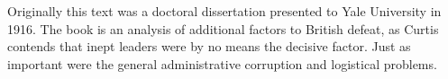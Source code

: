 Originally this text was a doctoral dissertation presented to Yale University in 1916. The book is an analysis of additional factors to British defeat, as Curtis contends that inept leaders were by no means the decisive factor. Just as important were the general administrative corruption and logistical problems.
